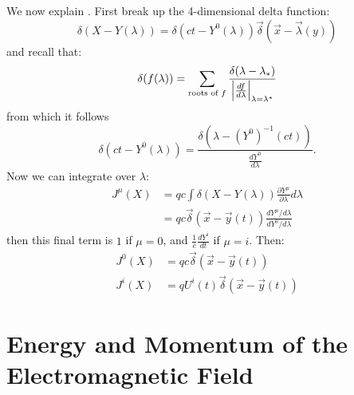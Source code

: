 \documentclass[../Main.tex]{subfiles}
\begin{document}
We now explain . First break up the 4-dimensional delta function:
\begin{equation*}
    \delta(X - Y(\lambda)) = \delta(ct - Y^0(\lambda))\vec{\delta}(\vec{x} - \vec{\lambda}(y))
\end{equation*}
and recall that:
\begin{equation*}
    \delta(f(\lambda)) = \sum_{\text{roots of }f} \frac{\delta(\lambda - \lambda_*)}{\left|\frac{df}{d\lambda}\right|_{\lambda = \lambda^*}}
\end{equation*}
from which it follows
\begin{equation*}
    \delta(ct - Y^0(\lambda)) = \frac{\delta(\lambda - (Y^0)^{-1}(ct))}{\frac{dY^0}{d\lambda}}.
\end{equation*}
Now we can integrate over $\lambda$:
\begin{align*}
    J^\mu(X) &= qc \int \delta(X - Y(\lambda)) \frac{\partial Y^\mu}{\partial \lambda} d\lambda \\
    &= qc \vec{\delta}(\vec{x} - \vec{y}(t)) \frac{dY^\mu / d\lambda}{dY^0 / d\lambda}
\end{align*}
then this final term is $1$ if $\mu = 0$, and $\frac1c \frac{dY^{i}}{dt}$ if $\mu = i$. Then:
\begin{align*}
    J^0(X) &= qc \vec{\delta}(\vec{x} - \vec{y}(t)) \\
    J^i(X) &= q U^i(t) \vec{\delta}(\vec{x} - \vec{y}(t))
\end{align*}
\section{Energy and Momentum of the Electromagnetic Field}
\end{document}
